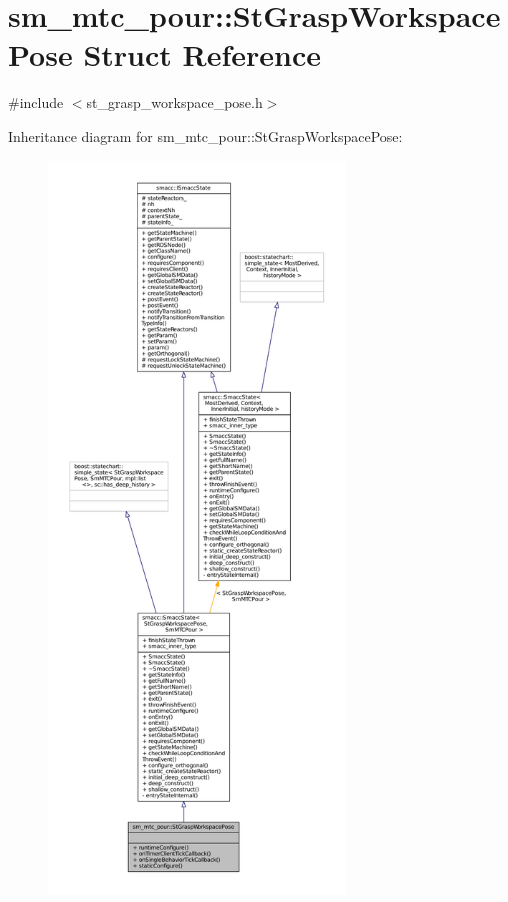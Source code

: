 \hypertarget{structsm__mtc__pour_1_1StGraspWorkspacePose}{}\section{sm\+\_\+mtc\+\_\+pour\+:\+:St\+Grasp\+Workspace\+Pose Struct Reference}
\label{structsm__mtc__pour_1_1StGraspWorkspacePose}


{\ttfamily \#include $<$st\+\_\+grasp\+\_\+workspace\+\_\+pose.\+h$>$}



Inheritance diagram for sm\+\_\+mtc\+\_\+pour\+:\+:St\+Grasp\+Workspace\+Pose\+:
\nopagebreak
\begin{figure}[H]
\begin{center}
\leavevmode
\includegraphics[height=550pt]{structsm__mtc__pour_1_1StGraspWorkspacePose__inherit__graph}
\end{center}
\end{figure}


